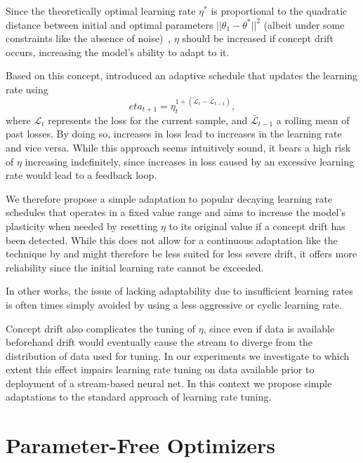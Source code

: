 \documentclass[letterpaper]{article} %
\begin{document}
Since the theoretically optimal learning rate $\eta^*$ is proportional to the quadratic distance between initial and optimal parameters $||\theta_1 - \theta^*||^2$ (albeit under some constraints like the absence of noise)~\cite{carmonMakingSGDParameterFree2023}, $\eta$ should be increased if concept drift occurs, increasing the model's ability to adapt to it.

Based on this concept, \citet{kunchevaAdaptiveLearningRate2008} introduced an adaptive schedule that updates the learning rate using
\begin{equation}
	eta_{t+1} = \eta_t^{1+(\mathcal{L}_t - \bar{\mathcal{L}}_{t-1})},
\end{equation}
where $\mathcal{L}_t$ represents the loss for the current sample, and $\bar{\mathcal{L}}_{t-1}$ a rolling mean of past losses.
By doing so, \citet{kunchevaAdaptiveLearningRate2008} increases in loss lead to increases in the learning rate and vice versa.
While this approach seems intuitively sound, it bears a high risk of $\eta$ increasing indefinitely, since increases in loss caused by an excessive learning rate would lead to a feedback loop.

We therefore propose a simple adaptation to popular decaying learning rate schedules that operates in a fixed value range and aims to increase the model's plasticity when needed by resetting $\eta$ to its original value if a concept drift has been detected.
While this does not allow for a continuous adaptation like the technique by \citet{kunchevaAdaptiveLearningRate2008} and might therefore be less suited for less severe drift, it offers more reliability since the initial learning rate cannot be exceeded.

In other works, the issue of lacking adaptability due to insufficient learning rates is often times simply avoided by using a less aggressive or cyclic learning rate.

Concept drift also complicates the tuning of $\eta$, since even if data is available beforehand drift would eventually cause the stream to diverge from the distribution of data used for tuning.
In our experiments we investigate to which extent this effect impairs learning rate tuning on data available prior to deployment of a stream-based neural net. In this context we propose simple adaptations to the standard approach of learning rate tuning.

\section{Parameter-Free Optimizers}
\end{document}
